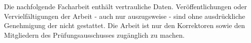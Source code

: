 Die nachfolgende Facharbeit enth\"alt vertrauliche Daten. Ver\"offentlichungen
oder Vervielf\"altigungen der Arbeit - auch nur auszugsweise - sind ohne ausdr\"uckliche Genehmigung
der \Firma nicht gestattet. Die Arbeit ist nur den Korrektoren sowie den Mitgliedern des
Pr\"ufungsausschusses zug\"anglich zu machen.